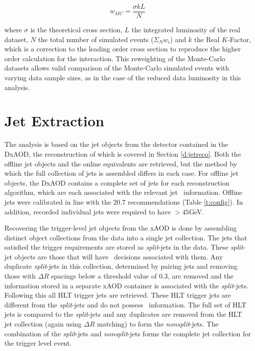 		 \begin{equation}
		 w_{MC} = \frac{\sigma k L}{N}
		 \end{equation}

		 where $\sigma$ is the theoretical cross section, $L$ the integrated luminosity of the real dataset, $N$ the total number of simulated events ($\Sigma_N w_i$) and $k$ the Real $K$-Factor, which is a correction to the leading order cross section to reproduce the higher order calculation for the interaction. This reweighting of the Monte-Carlo datasets allows valid comparison of the Monte-Carlo simulated events with varying data sample sizes, as in the case of the reduced data luminosity in this analysis.


	\section{Jet Extraction}
	\label{es:jetextract}

		The analysis is based on the jet objects from the detector contained in the DxAOD, the reconstruction of which is covered in Section \ref{d:jetreco}. Both the offline jet objects and the online equivalents are retrieved, but the method by which the full collection of jets is assembled differs in each case. For offline jet objects, the DxAOD contains a complete set of jets for each reconstruction algorithm, which are each associated with the relevant jet \btag\, information. Offline jets were calibrated in line with the 20.7 recommendations (Table \ref{t:config}). In addition, recorded individual jets were required to have \pt$>45$GeV.

		Recovering the trigger-level jet objects from the xAOD is done by assembling distinct object collections from the data into a single jet collection. The jets that satisfied the trigger requirements are stored as \textit{split}-jets in the data. These \textit{split}-jet objects are those that will have \btag\ decisions associated with them. Any duplicate \textit{split}-jets in this collection, determined by pairing jets and removing those with $\Delta R$ spacings below a threshold value of 0.3, are removed and the \btag\, information stored in a separate xAOD container is associated with the \textit{split}-jets. Following this all HLT trigger jets are retrieved. These HLT trigger jets are different from the \textit{split}-jets and do not possess \btag\, information. The full set of HLT jets is compared to the \textit{split}-jets and any duplicates are removed from the HLT jet collection (again using $\Delta R$ matching) to form the \textit{nonsplit}-jets. The combination of the \textit{split}-jets and \textit{nonsplit}-jets forms the complete jet collection for the trigger level event.

